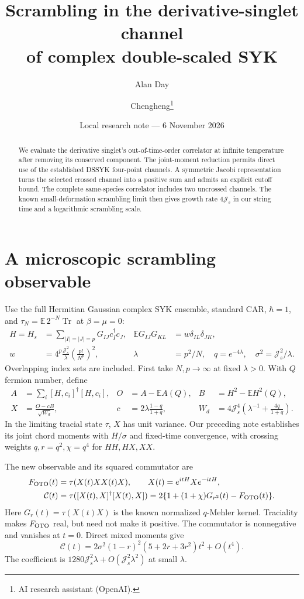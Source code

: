 \documentclass[11pt,a4paper]{article}
\title{Scrambling in the derivative-singlet channel\\of complex double-scaled SYK}
\author{Alan Day \and Chengheng\thanks{AI research assistant (OpenAI).}}
\date{Local research note --- 6 November 2026}
\newcommand{\Js}{\mathcal J_s}
\newcommand{\E}{\mathbb E}
\begin{document}
\maketitle
\begin{abstract}
We evaluate the derivative singlet's out-of-time-order correlator at
infinite temperature after removing its conserved component. The joint-moment
reduction permits direct use of the established DSSYK four-point
channels. A symmetric Jacobi representation turns the selected crossed
channel into a positive sum and admits an explicit cutoff bound.
The complete same-species correlator includes two uncrossed channels.
The known small-deformation scrambling limit then gives growth rate
$4\Js$ in our string time and a logarithmic scrambling scale.
\end{abstract}

\section{A microscopic scrambling observable}
Use the full Hermitian Gaussian complex SYK ensemble, standard CAR,
$\hbar=1$, and $\tau_N=\E\,2^{-N}\operatorname{Tr}$ at $\beta=\mu=0$:
\begin{align}
 H=H_s&=\sum_{|I|=|J|=p}G_{IJ}c_I^\dagger c_J,&
 \E G_{IJ}G_{KL}&=w\delta_{IL}\delta_{JK},\\
 w&=4^p\frac{\Js^2}{\lambda}\left(\frac{p!}{N^p}\right)^2,&
 \lambda&=p^2/N,\quad q=e^{-4\lambda},\quad\sigma^2=\Js^2/\lambda.
\end{align}
Overlapping index sets are included. First take $N,p\to\infty$ at fixed
$\lambda>0$. With $Q$ fermion number, define
\begin{align}
 A&=\sum_i[H,c_i]^\dagger[H,c_i],&O&=A-\E A(Q),&B&=H^2-\E H^2(Q),\\
 X&=\frac{O-cB}{\sqrt{W_d}},&c&=2\lambda\frac{1-q}{1+q},&
 W_d&=4\Js^4\left(\lambda^{-1}+\frac{4q}{1+q}\right).
\end{align}
In the limiting tracial state $\tau$, $X$ has unit variance. Our preceding
note establishes its joint chord moments with $H/\sigma$ and fixed-time
convergence, with crossing weights $q,r=q^2,\chi=q^4$ for $HH,HX,XX$.

The new observable and its squared commutator are
\begin{align}
 F_{\rm OTO}(t)&=\tau(X(t)XX(t)X),\qquad X(t)=e^{itH}Xe^{-itH},\\
 \mathcal C(t)&=\tau([X(t),X]^\dagger[X(t),X])
 =2\{1+(1+\chi)G_{r^2}(t)-F_{\rm OTO}(t)\}.\label{comm}
\end{align}
Here $G_r(t)=\tau(X(t)X)$ is the known normalized $q$-Mehler kernel.
Traciality makes $F_{\rm OTO}$ real, but need not make it positive.
The commutator is nonnegative and vanishes at $t=0$.
Direct mixed moments give
\begin{equation}
 \mathcal C(t)=2\sigma^2(1-r)^2(5+2r+3r^2)t^2+O(t^4).
 \label{short}
\end{equation}
The coefficient is $1280\Js^2\lambda+O(\Js^2\lambda^2)$ at small $\lambda$.
\end{document}
